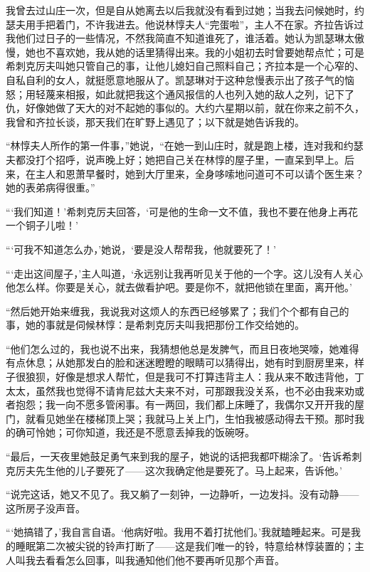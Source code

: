 \par 我曾去过山庄一次，但是自从她离去以后我就没有看到过她；当我去问候她时，约瑟夫用手把着门，不许我进去。他说林惇夫人“完蛋啦”，主人不在家。齐拉告诉过我他们过日子的一些情况，不然我简直不知道谁死了，谁活着。她认为凯瑟琳太傲慢，她也不喜欢她，我从她的话里猜得出来。我的小姐初去时曾要她帮点忙；可是希刺克厉夫叫她只管自己的事，让他儿媳妇自己照料自己；齐拉本是一个心窄的、自私自利的女人，就挺愿意地服从了。凯瑟琳对于这种怠慢表示出了孩子气的恼怒；用轻蔑来相报，如此就把我这个通风报信的人也列入她的敌人之列，记下了仇，好像她做了天大的对不起她的事似的。大约六星期以前，就在你来之前不久，我曾和齐拉长谈，那天我们在旷野上遇见了；以下就是她告诉我的。
\par “林惇夫人所作的第一件事，”她说，“在她一到山庄时，就是跑上楼，连对我和约瑟夫都没打个招呼，说声晚上好；她把自己关在林惇的屋子里，一直呆到早上。后来，在主人和恩萧早餐时，她到大厅里来，全身哆嗦地问道可不可以请个医生来？她的表弟病得很重。”
\par “‘我们知道！’希刺克厉夫回答，‘可是他的生命一文不值，我也不要在他身上再花一个铜子儿啦！’
\par “‘可我不知道怎么办，’她说，‘要是没人帮帮我，他就要死了！’
\par “‘走出这间屋子，’主人叫道，‘永远别让我再听见关于他的一个字。这儿没有人关心他怎么样。你要是关心，就去做看护吧。要是你不，就把他锁在里面，离开他。’
\par “然后她开始来缠我，我说我对这烦人的东西已经够累了；我们个个都有自己的事，她的事就是伺候林惇：是希刺克厉夫叫我把那份工作交给她的。
\par “他们怎么过的，我也说不出来，我猜想他总是发脾气，而且日夜地哭嚎，她难得有点休息；从她那发白的脸和迷迷瞪瞪的眼睛可以猜得出，她有时到厨房里来，样子很狼狈，好像是想求人帮忙，但是我可不打算违背主人：我从来不敢违背他，丁太太，虽然我也觉得不请肯尼兹大夫来不对，可那跟我没关系，也不必由我来劝或者抱怨；我一向不愿多管闲事。有一两回，我们都上床睡了，我偶尔又开开我的屋门，就看见她坐在楼梯顶上哭；我就马上关上门，生怕我被感动得去干预。那时我的确可怜她；可你知道，我还是不愿意丢掉我的饭碗呀。
\par “最后，一天夜里她鼓足勇气来到我的屋子，她说的话把我都吓糊涂了。‘告诉希刺克厉夫先生他的儿子要死了——这次我确定他是要死了。马上起来，告诉他。’
\par “说完这话，她又不见了。我又躺了一刻钟，一边静听，一边发抖。没有动静——这所房子没声音。
\par “‘她搞错了，’我自言自语。‘他病好啦。我用不着打扰他们。’我就瞌睡起来。可是我的睡眠第二次被尖锐的铃声打断了——这是我们唯一的铃，特意给林惇装置的；主人叫我去看看怎么回事，叫我通知他们他不要再听见那个声音。
